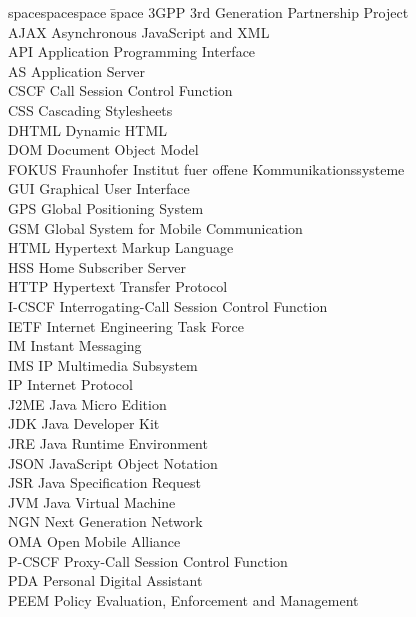 
\begin{tabbing}
spacespacespace \= space \kill
3GPP	 \> 	3rd Generation Partnership Project	 \\
AJAX	\>	Asynchronous JavaScript and XML \\
API	 \> 	Application Programming Interface	 \\
AS	\>	Application Server \\
CSCF	 \> 	Call Session Control Function	 \\
CSS	\>	Cascading Stylesheets \\
DHTML	\>	Dynamic HTML \\
DOM	\>	Document Object Model \\
FOKUS	\>	Fraunhofer Institut fuer offene Kommunikationssysteme \\
GUI	\>	Graphical User Interface \\
GPS	\>	Global Positioning System \\
GSM	\>	Global System for Mobile Communication\\
HTML	\>	Hypertext Markup Language \\
HSS	 \> 	Home Subscriber Server	 \\
HTTP	 \> 	Hypertext Transfer Protocol	 \\
I-CSCF	 \> 	Interrogating-Call Session Control Function	 \\
IETF	\>	Internet Engineering Task Force \\
IM	\>	Instant Messaging \\
IMS	 \> 	IP Multimedia Subsystem	 \\
IP	 \> 	Internet Protocol	 \\
J2ME	\>	Java Micro Edition \\
JDK	\>	Java Developer Kit \\
JRE	\>	Java Runtime Environment \\
JSON	\>	JavaScript Object Notation \\
JSR	\>	Java Specification Request \\
JVM	 \> 	Java Virtual Machine	 \\
NGN	 \> 	Next Generation Network	 \\
OMA	 \> 	Open Mobile Alliance	 \\
P-CSCF	 \> 	Proxy-Call Session Control Function	 \\
PDA	\>	Personal Digital Assistant \\
PEEM	 \> 	Policy Evaluation, Enforcement and Management	 \\

\end{tabbing}

